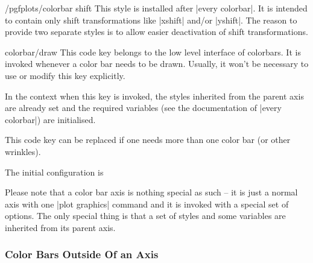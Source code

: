 \begin{stylekey}{/pgfplots/colorbar shift}
	This style is installed after |every colorbar|. It is intended to contain only shift transformations like |xshift| and/or |yshift|. The reason to provide two separate styles is to allow easier deactivation of shift transformations.

\begin{codeexample}
\end{codeexample}
\end{stylekey}


\begin{pgfplotscodekey}{colorbar/draw}
	This code key belongs to the low level interface of colorbars. It is invoked whenever a color bar needs to be drawn. Usually, it won't be necessary to use or modify this key explicitly.
	
	In the context when this key is invoked, the styles inherited from the parent axis are already set and the required variables (see the documentation of |every colorbar|) are initialised.

	This code key can be replaced if one needs more than one color bar (or other wrinkles).

	The initial configuration is
\begin{codeexample}
\end{codeexample}

	Please note that a color bar axis is nothing special as such -- it is just a normal axis with one |plot graphics| command and it is invoked with a special set of options. The only special thing is that a set of styles and some variables are inherited from its parent axis.
\end{pgfplotscodekey}

\subsubsection{Color Bars Outside Of an Axis}

